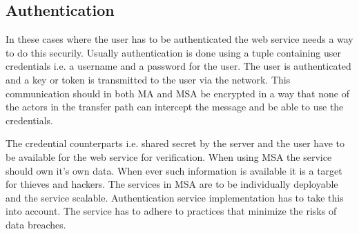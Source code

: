 \begin{sloppypar}
\subsection{Authentication}
\begin{sloppypar}
    In these cases where the user has to be authenticated the web service needs 
    a way to do this securily. Usually authentication is done using a tuple 
    containing user credentials i.e. a username and a password for the user. The
    user is authenticated and a key or token is transmitted to the user via the 
    network. This communication should in both MA and MSA be encrypted in a way 
    that none of the actors in the transfer path can intercept the message and 
    be able to use the credentials.
\end{sloppypar}
\begin{sloppypar}
    The credential counterparts i.e. shared secret by the server and the user 
    have to be available for the web service for verification. When using MSA 
    the service should own it's own data. When ever such information is 
    available it is a target for thieves and hackers. The services in MSA are 
    to be individually deployable and the service scalable. Authentication 
    service implementation has to take this into account. The service has to 
    adhere to practices that minimize the risks of data breaches. 
\end{sloppypar}
    

\end{sloppypar}
